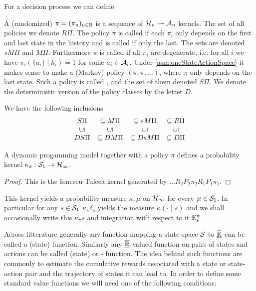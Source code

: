 For a decision process we can define
\begin{defn}[Policy]
  A (randomized)  $\pi = (\pi_n)_{n \in \mathbb{N}}$
  is a sequence of $\mathcal{H}_n \leadsto \mathcal{A}_n$ kernels.
  The set of all policies we denote $R\Pi$.
  The policy $\pi$ is called  if each $\pi_i$ only depends
  on the first and last state in the history
  and is called  if only the last.
  The sets are denoted $sM\Pi$ and $M\Pi$.
  Furthermore $\pi$ is called  if all $\pi_i$
  are degenerate, i.e. for all $i$ we have
  $\pi_i(\{a_i\} \mid h_i) = 1$ for some $a_i \in \mathcal{A}_{i}$.
  Under \cref{asm:oneStateActionSpace}
  it makes sense to make a (Markov) policy $(\pi, \pi, \dots)$,
  where $\pi$ only depends on the last state.
  Such a policy is called ,
  and the set of them denoted $S\Pi$.
  We denote the deterministic version of the policy classes
  by the letter $D$.
\end{defn}
We have the following inclusions
\[ \begin{matrix}
  S\Pi &\subseteq M\Pi &\subseteq sM\Pi &\subseteq R\Pi
  \\ \rleft{\subseteq} & \rleft{\subseteq} & \rleft{\subseteq} & \rleft{\subseteq} 
  \\ DS\Pi &\subseteq DM\Pi &\subseteq DsM\Pi &\subseteq D\Pi
\end{matrix} \] 

\begin{prop}
A dynamic progamming model together with a policy $\pi$ defines a
probability kernel $\kappa_\pi : \mathcal{S}_1 \to \mathcal{H}_\infty$.
\end{prop}
\begin{proof}
  This is the Ionescu-Tulcea kernel generated by
  $\dots R_2 P_2 \pi_2 R_1 P_1 \pi_1$.
\end{proof}
This kernel yields a probability measure $\kappa_\pi \mu$ on $\mathcal{H}_\infty$
for every $\mu \in \mathcal{S}_1$. In particular for any $s \in \mathcal{S}_1$
$\kappa_\pi \delta_s$ yields the measure $\kappa(\cdot \mid s)$
and we shall occasionally write this $\kappa_\pi s$ and
integration with respect to it $\mathbb{E}^\pi_s$.

Across litterature generally %
any function mapping a state space $\mathcal{S}$ to $\overline{\underline{\mathbb{R}}}$
can be called a (state)
 function. Similarly any $\underline{\overline{\mathbb{R}}}$ valued function
on pairs of states and actions can be called (state)
 or - function.
The idea behind such functions are commonly to estimate the
cumulative rewards associated with a state or state-action pair
and the trajectory of states it can lead to.
In order to define some standard value functions
we will need one of
the following conditions:

